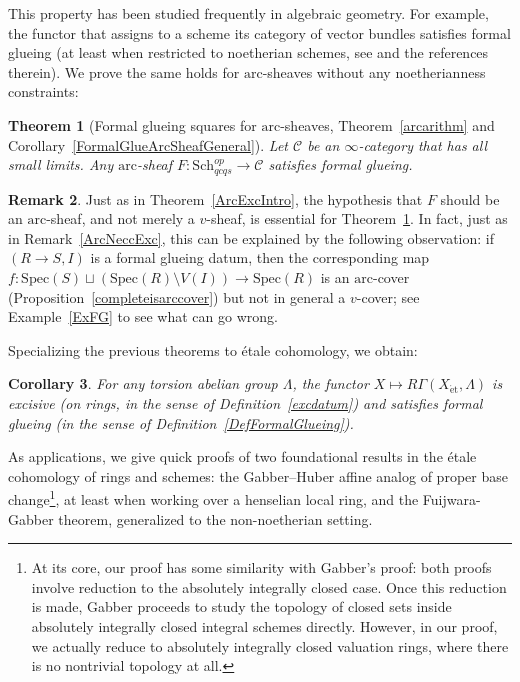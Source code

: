\documentclass[reqno]{amsart}
\newcommand{\spec}{\mathrm{Spec}}
\newcommand{\et}{\mathrm{\acute{e}t}}
\newcommand{\arc}{\mathrm{arc}}
\newtheorem{theorem}{Theorem}[section]
\newtheorem{corollary}[theorem]{Corollary}
\theoremstyle{definition}
\newtheorem{remark}[theorem]{Remark}
\begin{document}
This property has been studied frequently in algebraic geometry. For example, the functor that assigns to a scheme its category of vector bundles satisfies formal glueing (at least when restricted to noetherian schemes, see \cite[Tag 05E5]{stacks-project} and the references therein). We prove the same holds for $\arc$-sheaves without any noetherianness constraints:




\begin{theorem}[Formal glueing squares for $\arc$-sheaves, Theorem~\ref{arcarithm}
 and 
Corollary~\ref{FormalGlueArcSheafGeneral}]
\label{FormalGlueing}
Let $\mathcal{C}$ be an $\infty$-category that has all small limits. 
Any $\arc$-sheaf $F\colon \mathrm{Sch}_{qcqs}^{op} \to \mathcal{C}$ satisfies formal glueing.
\end{theorem} 


\begin{remark}
Just as in Theorem~\ref{ArcExcIntro}, the hypothesis that $F$ should be an
$\arc$-sheaf, and not merely a $v$-sheaf, is essential
for Theorem~\ref{FormalGlueing}. In fact, just as in Remark~\ref{ArcNeccExc},
this can be explained by the following observation: if $(R \to S, I)$ is a
formal glueing datum, then the corresponding map $f\colon \spec(S) \sqcup
(\spec(R) \setminus V(I)) \to \spec(R)$ is an $\arc$-cover (Proposition~\ref{completeisarccover}) but not in general a $v$-cover; see Example~\ref{ExFG} to see what can go wrong.
\end{remark}



Specializing the previous theorems to \'etale cohomology, we obtain:


\begin{corollary} 
\label{etaleexc}
For any torsion abelian group $\Lambda$, the functor $X \mapsto R\Gamma(X_{\et}, \Lambda)$ is excisive (on rings, in the sense of Definition~\ref{excdatum}) and satisfies formal glueing (in the sense of Definition~\ref{DefFormalGlueing}).
\end{corollary} 




As applications, we give quick proofs of two foundational results in the
\'etale cohomology of rings and schemes: the Gabber--Huber affine analog of
proper base change\footnote{At its core, our proof has some similarity with Gabber's proof:
both proofs involve reduction to the absolutely integrally closed case. Once
this reduction is made, Gabber proceeds to study the topology of closed sets
inside absolutely integrally closed integral schemes directly. However, in our
proof, we actually reduce to absolutely integrally closed valuation rings, where
there is no nontrivial topology at all.}, at least when working over a henselian
local ring, and the Fuijwara-Gabber theorem, generalized to the non-noetherian setting.
\end{document}
